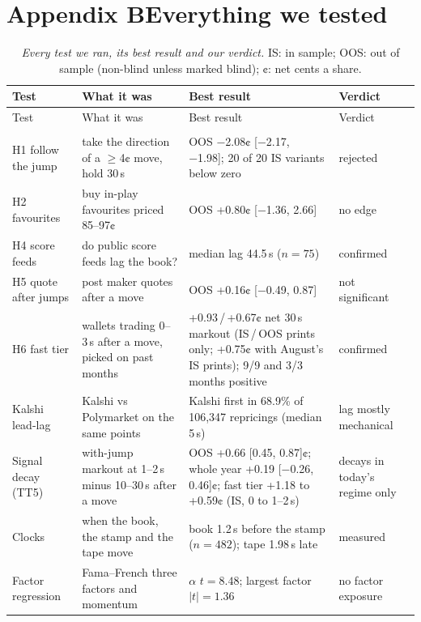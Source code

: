 \documentclass[11pt,letterpaper]{article}
\begin{document}
\section*{Appendix B\quad Everything we tested}
{\tabnums\setlength\tabcolsep{4pt}
\begin{longtable}{@{}>{\raggedright\arraybackslash}p{1.12in}>{\raggedright\arraybackslash}p{1.72in}>{\raggedright\arraybackslash}p{2.4in}>{\raggedright\arraybackslash}p{0.92in}@{}}
\caption{\emph{Every test we ran, its best result and our verdict.} IS: in sample; OOS: out of sample (non-blind
unless marked blind); ¢: net cents a share.}\label{tab:A-all}\\
\toprule
Test & What it was & Best result & Verdict \\
\midrule
\endfirsthead
\toprule
Test & What it was & Best result & Verdict \\
\midrule
\endhead
\bottomrule
\endfoot
\multicolumn{4}{@{}l}{\emph{Who is fast, and what they earn (public tapes)}} \\
H1 follow the jump & take the direction of a $\geq$4¢ move, hold 30\,s & OOS −2.08¢ [−2.17, −1.98]; 20 of 20 IS variants below zero & rejected \\
H2 favourites & buy in-play favourites priced 85--97¢ & OOS +0.80¢ [−1.36, 2.66] & no edge \\
H4 score feeds & do public score feeds lag the book? & median lag 44.5\,s ($n = 75$) & confirmed \\
H5 quote after jumps & post maker quotes after a move & OOS +0.16¢ [−0.49, 0.87] & not significant \\
H6 fast tier & wallets trading 0--3\,s after a move, picked on past months & +0.93\,/\,+0.67¢ net 30\,s markout (IS\,/\,OOS prints only; +0.75¢ with August's IS prints); 9/9 and 3/3 months positive & confirmed \\
Kalshi lead-lag & Kalshi vs Polymarket on the same points & Kalshi first in 68.9\% of 106,347 repricings (median 5\,s) & lag mostly mechanical \\
Signal decay (TT5) & with-jump markout at 1--2\,s minus 10--30\,s after a move & OOS +0.66 [0.45, 0.87]¢; whole year +0.19 [−0.26, 0.46]¢; fast tier +1.18 to +0.59¢ (IS, 0 to 1--2\,s) & decays in today's regime only \\
Clocks & when the book, the stamp and the tape move & book 1.2\,s before the stamp ($n = 482$); tape 1.98\,s late & measured \\
Factor regression & Fama--French three factors and momentum & $\alpha$ $t = 8.48$; largest factor $|t| = 1.36$ & no factor exposure \\

\end{longtable}}
\end{document}
